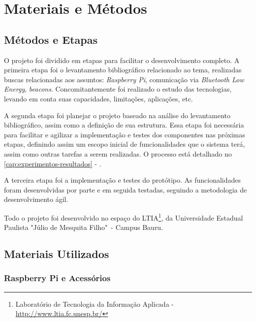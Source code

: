\documentclass[
		12pt,				%
		openright,			%
		oneside,			%
		a4paper,			%
		chapter=TITLE,		%
		english,			%
		brazil				%
	]{abntex2}
\begin{document}


\chapter{Materiais e Métodos}\label{cap:materiais-e-metodos}

\section{Métodos e Etapas}\label{sec:metodos-etapas}

O projeto foi dividido em etapas para facilitar o desenvolvimento completo. A primeira etapa foi o levantamento bibliográfico relacionado ao tema, realizadas buscas relacionadas aos assuntos: \textit{Raspberry Pi}, comunicação via \textit{Bluetooth Low Energy}, \textit{beacons}. Concomitantemente foi realizado o estudo das tecnologias, levando em conta suas capacidades, limitações, aplicações, etc.

A segunda etapa foi planejar o projeto baseado na análise do levantamento bibliográfico, assim como a definição de sua estrutura. Essa etapa foi necessária para facilitar e agilizar a implementação e testes dos componentes nas próximas etapas, definindo assim um escopo inicial de funcionalidades que o sistema terá, assim como outras tarefas a serem realizadas. O processo está detalhado no \autoref{cap:experimentos-resultados} - .

A terceira etapa foi a implementação e testes do protótipo. As funcionalidades foram desenvolvidas por parte e em seguida testadas, seguindo a metodologia de desenvolvimento ágil.

Todo o projeto foi desenvolvido no espaço do LTIA\footnote{Laboratório de Tecnologia da Informação Aplicada - \url{http://www.ltia.fc.unesp.br/}}, da Universidade Estadual Paulista "Júlio de Mesquita Filho"\ - Campus Bauru.


\section{Materiais Utilizados}\label{sec:materiais-utilizados}

\subsection{Raspberry Pi e Acessórios}\label{sec:rpi-acessorios}
\end{document}
